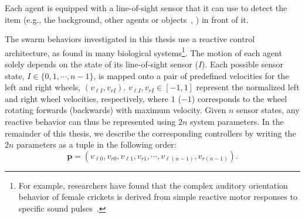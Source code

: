 Each agent is equipped with a line-of-sight sensor that it can use to detect the item (e.g., the background, other agents or objects~\cite{Gauci2014_ijrr}, \cite{Melvin2014_aamas}) in front of it. 

The swarm behaviors investigated in this thesis use a reactive control architecture, as found in many biological systems\footnote{For example, researchers have found that the complex auditory orientation behavior of female crickets is derived from simple reactive motor responses to specific sound pulses~\cite{Hedwig2004}.}. 
The motion of each agent solely depends on the state of its line-of-sight sensor ($I$). Each possible sensor state, $I\in\{0,1,\cdots,n-1\}$, is mapped onto a pair of predefined velocities for the left and right wheels, $(v_{\ell I}, v_{rI})$. $v_{\ell I}, v_{rI} \in \left[-1,1\right]$ represent the normalized left and right wheel velocities, respectively, where $1$ ($-1$) corresponds to the wheel rotating forwards (backwards) with maximum velocity. Given $n$ sensor states, any reactive behavior can thus be represented using $2n$ system parameters. In the remainder of this thesis, we describe the corresponding controllers by writing the $2n$ parameters as a tuple in the following order:
\begin{equation}\label{controller:form}
\mathbf{p} = (v_{\ell 0}, v_{r0}, v_{\ell1}, v_{r1}, \cdots, v_{\ell (n-1)}, v_{r (n-1)}).
\end{equation}

